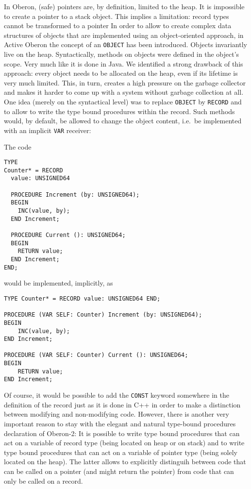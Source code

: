 \documentclass[a4wide,11pt]{article}
\begin{document}
\begin{annotation}
In Oberon, (safe) pointers are, by definition, limited to the heap.
It is impossible to create a pointer to a stack object.
This implies a limitation: record types cannot be transformed to a pointer
In order to allow to create complex data structures of objects that are implemented using an object-oriented approach, in Active Oberon the concept of an \lstinline"OBJECT" has been introduced. Objects invariantly live on the heap.
Syntactically, methods on objects were defined in the object's scope. Very much like it is done in Java.
We identified a strong drawback of this approach: every object needs to be allocated on the heap, even if its lifetime is very much limited.
This, in turn, creates a high pressure on the garbage collector and makes it harder to come up with a system without garbage collection at all.
One idea (merely on the syntactical level) was to replace \lstinline"OBJECT" by \lstinline"RECORD" and to allow to write the type bound procedures within the record. 
Such methods would, by default, be allowed to change the object content, i.e.\ be implemented with an implicit \lstinline"VAR" receiver:

The code
\begin{lstlisting}[style=example]
TYPE 
Counter* = RECORD 
  value: UNSIGNED64

  PROCEDURE Increment (by: UNSIGNED64);
  BEGIN
    INC(value, by);
  END Increment;

  PROCEDURE Current (): UNSIGNED64;
  BEGIN
    RETURN value;
  END Increment;
END;
\end{lstlisting}
would be implemented, implicitly, as
\begin{lstlisting}[style=example]
TYPE Counter* = RECORD value: UNSIGNED64 END;

PROCEDURE (VAR SELF: Counter) Increment (by: UNSIGNED64);
BEGIN
	INC(value, by);
END Increment;

PROCEDURE (VAR SELF: Counter) Current (): UNSIGNED64;
BEGIN
	RETURN value;
END Increment;
\end{lstlisting}
Of course, it would be possible to add the \lstinline"CONST" keyword somewhere in the definition of the record just as it is done in C++ in order to make a distinction between modifying and non-modifying code. 
However, there is another very important reason to stay with the elegant and natural type-bound procedures declaration of Oberon-2:
It is possible to write type bound procedures that can act on a variable of record type (being located on heap or on stack) and to write type bound procedures that can act on a variable of pointer type (being solely located on the heap). 
The latter allows to explicitly distinguih between code that can be called on a pointer (and might return the pointer) from code that can only be called on a record.


\end{annotation}
\end{document}
